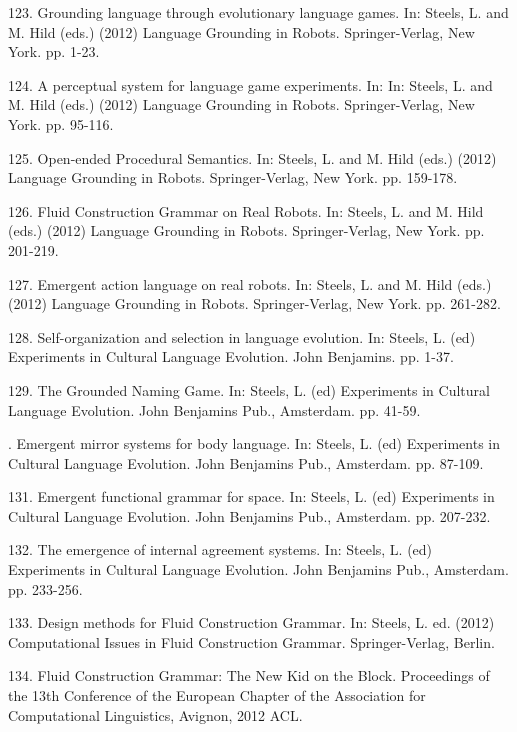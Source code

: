 123. \citet{Steels:12f} Grounding language through evolutionary language games. In: Steels, L. and M. Hild (eds.) (2012) Language Grounding in Robots. Springer-Verlag, New York. pp. 1-23.

124. \citet{Spranger:12g} A perceptual system for language game experiments. In: In: Steels, L. and M. Hild (eds.) (2012) Language Grounding in Robots. Springer-Verlag, New York. pp. 95-116. 

125. \citet{Spranger:12h} Open-ended Procedural Semantics. In: Steels, L. and M. Hild (eds.) (2012) Language Grounding in Robots. Springer-Verlag, New York. pp. 159-178. 

126. \citet{Steels:12i} Fluid Construction Grammar on Real Robots. In: Steels, L. and M. Hild (eds.) (2012) Language Grounding in Robots. Springer-Verlag, New York. pp. 201-219. 

127. \citet{Steels:12j} Emergent action language on real robots. In: Steels, L. and M. Hild (eds.) (2012) Language Grounding in Robots. Springer-Verlag, New York. pp. 261-282. 

128. \citet{Steels:12k} Self-organization and selection in language evolution. In: Steels, L. (ed) Experiments in Cultural Language Evolution. John Benjamins. pp. 1-37. 

129. \citet{Steels:12l} The Grounded Naming Game. In: Steels, L. (ed) Experiments in Cultural Language Evolution. John Benjamins Pub., Amsterdam. pp. 41-59. 

. \citet{Steels:12m} Emergent mirror systems for body language. In: Steels, L. (ed) Experiments in Cultural Language Evolution. John Benjamins Pub., Amsterdam. pp. 87-109. 

131. \citet{spranger:12n} Emergent functional grammar for space. In: Steels, L. (ed) Experiments in Cultural Language Evolution. John Benjamins Pub., Amsterdam. pp. 207-232. 

132. \citet{beuls:12o} The emergence of internal agreement systems. In: Steels, L. (ed) Experiments in Cultural Language Evolution. John Benjamins Pub., Amsterdam. pp. 233-256. 

133. \citet{Steels:12p}  Design methods for Fluid Construction Grammar. In: Steels, L. ed. (2012) Computational Issues in Fluid Construction Grammar. Springer-Verlag, Berlin.  

134. \citet{Vantrijp:12q} Fluid Construction Grammar: The New Kid on the Block. Proceedings of the 13th Conference of the European Chapter of the Association for Computational Linguistics, Avignon, 2012 ACL.

